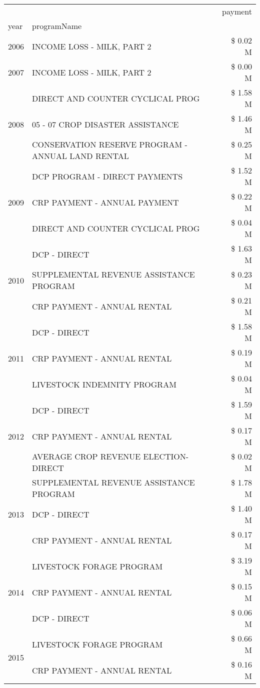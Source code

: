 \begin{tabular}{llr}
\toprule
 &  & payment \\
year & programName &  \\
\midrule
2006 & INCOME LOSS - MILK, PART 2 & \$ 0.02 M \\
\cline{1-3}
2007 & INCOME LOSS - MILK, PART 2 & \$ 0.00 M \\
\cline{1-3}
\multirow[t]{3}{*}{2008} & DIRECT AND COUNTER CYCLICAL PROG & \$ 1.58 M \\
 & 05 - 07 CROP DISASTER ASSISTANCE & \$ 1.46 M \\
 & CONSERVATION RESERVE PROGRAM - ANNUAL LAND RENTAL & \$ 0.25 M \\
\cline{1-3}
\multirow[t]{3}{*}{2009} & DCP PROGRAM - DIRECT PAYMENTS & \$ 1.52 M \\
 & CRP PAYMENT - ANNUAL PAYMENT & \$ 0.22 M \\
 & DIRECT AND COUNTER CYCLICAL PROG & \$ 0.04 M \\
\cline{1-3}
\multirow[t]{3}{*}{2010} & DCP - DIRECT & \$ 1.63 M \\
 & SUPPLEMENTAL REVENUE ASSISTANCE PROGRAM & \$ 0.23 M \\
 & CRP PAYMENT - ANNUAL RENTAL & \$ 0.21 M \\
\cline{1-3}
\multirow[t]{3}{*}{2011} & DCP - DIRECT & \$ 1.58 M \\
 & CRP PAYMENT - ANNUAL RENTAL & \$ 0.19 M \\
 & LIVESTOCK INDEMNITY PROGRAM & \$ 0.04 M \\
\cline{1-3}
\multirow[t]{3}{*}{2012} & DCP - DIRECT & \$ 1.59 M \\
 & CRP PAYMENT - ANNUAL RENTAL & \$ 0.17 M \\
 & AVERAGE CROP REVENUE ELECTION-DIRECT & \$ 0.02 M \\
\cline{1-3}
\multirow[t]{3}{*}{2013} & SUPPLEMENTAL REVENUE ASSISTANCE PROGRAM & \$ 1.78 M \\
 & DCP - DIRECT & \$ 1.40 M \\
 & CRP PAYMENT - ANNUAL RENTAL & \$ 0.17 M \\
\cline{1-3}
\multirow[t]{3}{*}{2014} & LIVESTOCK FORAGE PROGRAM & \$ 3.19 M \\
 & CRP PAYMENT - ANNUAL RENTAL & \$ 0.15 M \\
 & DCP - DIRECT & \$ 0.06 M \\
\cline{1-3}
\multirow[t]{3}{*}{2015} & LIVESTOCK FORAGE PROGRAM & \$ 0.66 M \\
 & CRP PAYMENT - ANNUAL RENTAL & \$ 0.16 M \\

\end{tabular}
